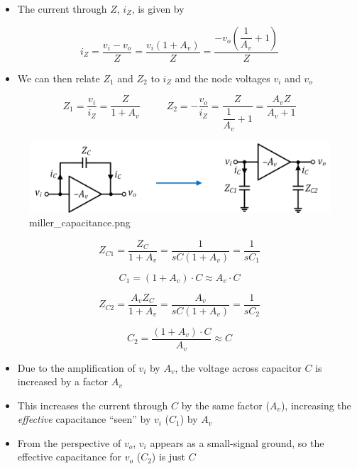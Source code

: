 \documentclass[11pt]{article}
\providecommand{\tightlist}{%
      \setlength{\itemsep}{0pt}\setlength{\parskip}{0pt}}
\begin{document}
    \begin{itemize}
\tightlist
\item
  The current through \(Z\), \(i_Z\), is given by
\end{itemize}

\begin{equation}
i_Z = \dfrac{v_i - v_o}{Z} = \dfrac{v_i(1 + A_v)}{Z} = \dfrac{-v_o \left(\dfrac{1}{A_v}+1\right)}{Z}
\end{equation}

\begin{itemize}
\tightlist
\item
  We can then relate \(Z_1\) and \(Z_2\) to \(i_Z\) and the node
  voltages \(v_i\) and \(v_o\)
\end{itemize}

\begin{equation}
Z_1 = \dfrac{v_i}{i_Z} = \dfrac{Z}{1+A_v} \:\:\:\:\:\:\:\:\:\:\:\: Z_2 = -\dfrac{v_o}{i_Z} = \dfrac{Z}{\dfrac{1}{A_v}+1} = \dfrac{A_v Z}{A_v + 1}
\end{equation}

    \begin{figure}
\centering
\includegraphics{miller_capacitance.png}
\caption{miller\_capacitance.png}
\end{figure}

    \begin{equation}
Z_{C1} = \dfrac{Z_C}{1+A_v} = \dfrac{1}{sC(1+A_v)} = \dfrac{1}{sC_1}
\end{equation}

\begin{equation}
\boxed{C_1 = (1+A_v) \cdot C \approx A_v \cdot C}
\end{equation}

    \begin{equation}
Z_{C2} = \dfrac{A_vZ_C}{1+A_v} = \dfrac{A_v}{sC(1+A_v)} = \dfrac{1}{sC_2}
\end{equation}

\begin{equation}
\boxed{C_2 = \dfrac{(1+A_v) \cdot C}{A_v} \approx C}
\end{equation}

    \begin{itemize}
\tightlist
\item
  Due to the amplification of \(v_i\) by \(A_v\), the voltage across
  capacitor \(C\) is increased by a factor \(A_v\)
\item
  This increases the current through \(C\) by the same factor (\(A_v\)),
  increasing the \emph{effective} capacitance ``seen'' by \(v_i\)
  (\(C_1\)) by \(A_v\)
\item
  From the perspective of \(v_o\), \(v_i\) appears as a small-signal
  ground, so the effective capacitance for \(v_o\) (\(C_2\)) is just
  \(C\)
\end{itemize}
\end{document}
